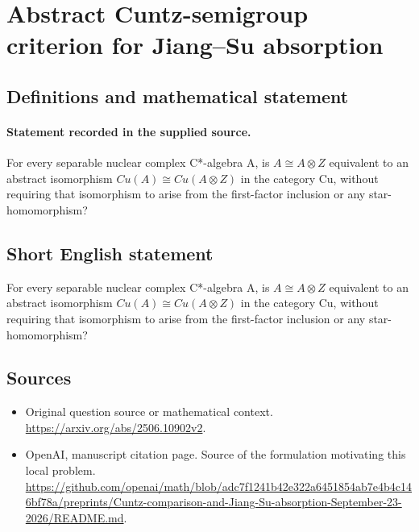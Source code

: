 \documentclass[11pt]{article}
\begin{document}
\section*{Abstract Cuntz-semigroup criterion for Jiang–Su absorption}\label{statement}
\subsection{Definitions and mathematical statement}
\paragraph{Statement recorded in the supplied source.}
For every separable nuclear complex C*-algebra A, is $A\cong A\otimes Z$ equivalent to an abstract isomorphism $Cu(A)\cong Cu(A\otimes Z)$ in the category Cu, without requiring that isomorphism to arise from the first-factor inclusion or any star-homomorphism?
\subsection{Short English statement}
For every separable nuclear complex C*-algebra A, is $A\cong A\otimes Z$ equivalent to an abstract isomorphism $Cu(A)\cong Cu(A\otimes Z)$ in the category Cu, without requiring that isomorphism to arise from the first-factor inclusion or any star-homomorphism?
\subsection{Sources}
\begin{itemize}
\item[S1] Original question source or mathematical context.
\url{https://arxiv.org/abs/2506.10902v2}.
\item[S2] OpenAI, manuscript citation page. Source of the formulation motivating this local problem.
\url{https://github.com/openai/math/blob/adc7f1241b42e322a6451854ab7e4b4c146bf78a/preprints/Cuntz-comparison-and-Jiang-Su-absorption-September-23-2026/README.md}.
\end{itemize}
\end{document}
